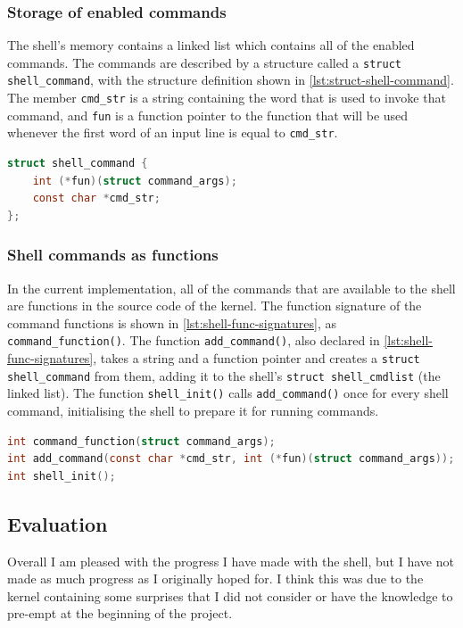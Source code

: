 \documentclass{article}
\begin{document}
\subsubsection{Storage of enabled commands}
The shell's memory contains a linked list which contains all of the enabled
commands. The commands are described by a structure called a \texttt{struct
shell\_command}, with the structure definition shown in
\autoref{lst:struct-shell-command}. The member \verb!cmd_str! is a string
containing the word that is used to invoke that command, and \verb!fun! is a
function pointer to the function that will be used whenever the first word of
an input line is equal to \verb!cmd_str!.

\begin{lstlisting}[language=C, caption={The definition of the
                   \texttt{shell\_command} struct}, float,
                   label={lst:struct-shell-command}]
struct shell_command {
    int (*fun)(struct command_args);
    const char *cmd_str;
};
\end{lstlisting}

\subsubsection{Shell commands as functions}
In the current implementation, all of the commands that are available to the
shell are functions in the source code of the kernel. The function signature of
the command functions is shown in \autoref{lst:shell-func-signatures}, as
\verb!command_function()!. The function \verb!add_command()!, also declared in
\autoref{lst:shell-func-signatures}, takes a string and a function pointer and
creates a \verb!struct shell_command! from them, adding it to the shell's
\verb!struct shell_cmdlist! (the linked list). The function \verb!shell_init()!
calls \verb!add_command()! once for every shell command, initialising the shell
to prepare it for running commands.

\begin{lstlisting}[language=C, caption={The signatures of some important
                   functions for the shell}, float,
                   label={lst:shell-func-signatures}]
int command_function(struct command_args);
int add_command(const char *cmd_str, int (*fun)(struct command_args));
int shell_init();
\end{lstlisting}

\subsection{Evaluation}
Overall I am pleased with the progress I have made with the shell, but I have
not made as much progress as I originally hoped for. I think this was due to
the kernel containing some surprises that I did not consider or have the
knowledge to pre-empt at the beginning of the project.
\end{document}

